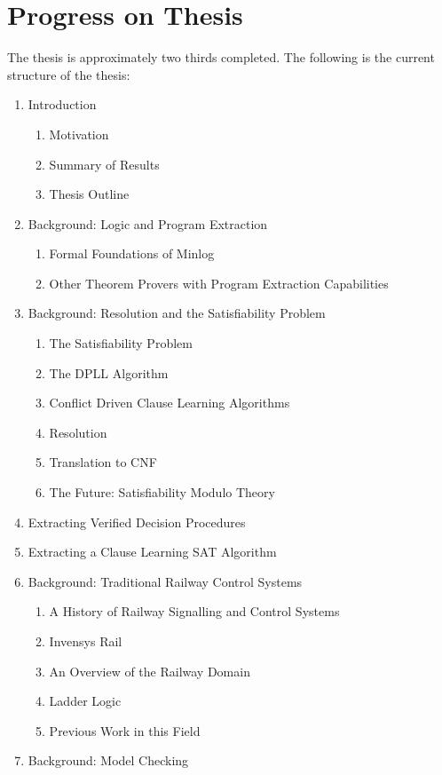 \documentclass{article}
\begin{document}
\section{Progress on Thesis}
The thesis is approximately two thirds completed. The following is the current structure of the thesis: 
\begin{enumerate}
\item  Introduction  
\begin{enumerate}  [label*=\arabic*.]
\item  Motivation 
\item  Summary of Results
\item  Thesis Outline
\end{enumerate}
\item Background: Logic and Program Extraction 
\begin{enumerate}[label*=\arabic*.]
\item Formal Foundations of Minlog 
\item  Other Theorem Provers with Program Extraction Capabilities
\end{enumerate}
\item Background: Resolution and the Satisfiability Problem 
\begin{enumerate}[label*=\arabic*.]
\item The Satisfiability Problem
\item The DPLL Algorithm
\item Conflict Driven Clause Learning Algorithms
\item Resolution
\item Translation to CNF
\item The Future: Satisfiability Modulo Theory
\end{enumerate}
\item Extracting Verified Decision Procedures 
\item Extracting a Clause Learning SAT Algorithm
\item Background: Traditional Railway Control Systems 
\begin{enumerate}[label*=\arabic*.]
\item A History of Railway Signalling and Control Systems 
\item Invensys Rail 
\item An Overview of the Railway Domain 
\item Ladder Logic 
\item Previous Work in this Field
\end{enumerate}
\item Background: Model Checking 

\end{enumerate}
\end{document}
